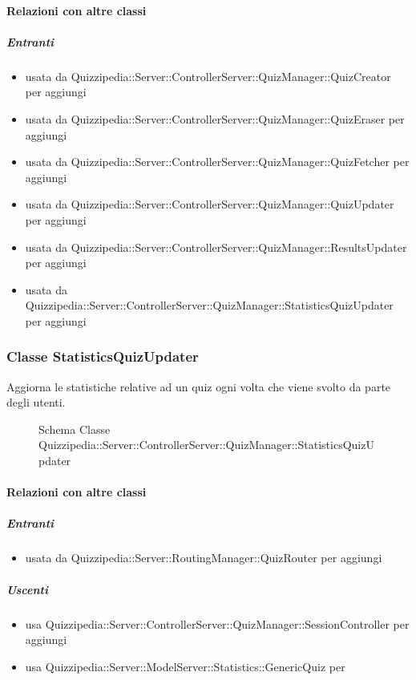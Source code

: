 \paragraph{Relazioni con altre classi}
\subparagraph{Entranti}
\begin{itemize}
\item usata da Quizzipedia::Server::ControllerServer::QuizManager::QuizCreator per aggiungi
\item usata da Quizzipedia::Server::ControllerServer::QuizManager::QuizEraser per aggiungi
\item usata da Quizzipedia::Server::ControllerServer::QuizManager::QuizFetcher per aggiungi
\item usata da Quizzipedia::Server::ControllerServer::QuizManager::QuizUpdater per aggiungi
\item usata da Quizzipedia::Server::ControllerServer::QuizManager::ResultsUpdater per aggiungi
\item usata da Quizzipedia::Server::ControllerServer::QuizManager::StatisticsQuizUpdater per aggiungi
\end{itemize}
\subsubsection{Classe StatisticsQuizUpdater}
Aggiorna le statistiche relative ad un quiz ogni volta che viene svolto da parte degli utenti.
\begin{figure}[H]
\centering
\noindent{}
\caption[Schema Classe StatisticsQuizUpdater]{Schema Classe Quizzipedia::Server::ControllerServer::QuizManager::StatisticsQuizUpdater}
\end{figure}
\paragraph{Relazioni con altre classi}
\subparagraph{Entranti}
\begin{itemize}
\item usata da Quizzipedia::Server::RoutingManager::QuizRouter per aggiungi
\end{itemize}
\subparagraph{Uscenti}
\begin{itemize}
\item usa Quizzipedia::Server::ControllerServer::QuizManager::SessionController per aggiungi
\item usa Quizzipedia::Server::ModelServer::Statistics::GenericQuiz per 
\end{itemize}
